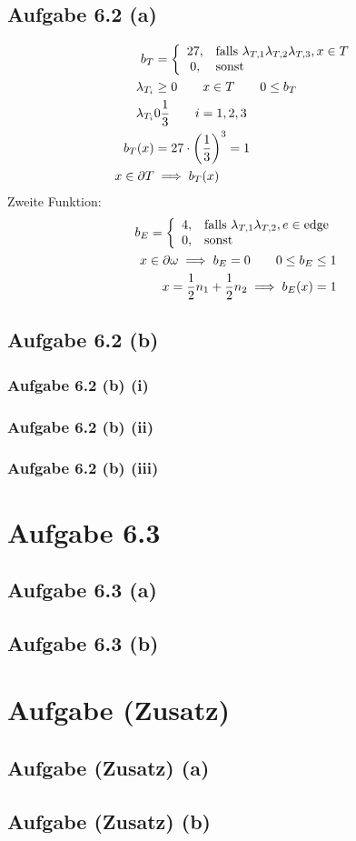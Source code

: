 \documentclass[12pt,a4paper]{article}
\begin{document}
\subsection*{Aufgabe 6.2 (a)}
\begin{align*}
	b_T&=\left\lbrace\begin{array}{cl}
		27, &\text{falls } \lambda_{T,1}\lambda_{T,2}\lambda_{T,3},x\in T\\
		0, &\text{sonst }
	\end{array}\right.\\
	\lambda_{T_i}&\geq 0\qquad x\in T\qquad 0\leq b_T\\
	\lambda_{T_i}&0\frac{1}{3}\qquad i=1,2,3\\
	b_T(x)&=27\cdot\left(\frac{1}{3}\right)^3=1\\
	x\in\partial T&\implies b_T(x)
\end{align*}
Zweite Funktion:
\begin{align*}
	b_E=\left\lbrace\begin{array}{cl}
		4, &\text{falls }\lambda_{T,1}\lambda_{T,2},e\in\text{edge}\\
		0, &\text{sonst }
	\end{array}\right.\\
	x\in\partial\omega\implies b_E=0\qquad 0\leq b_E\leq 1\\
	x=\frac{1}{2}n_1+\frac{1}{2}n_2\implies b_E(x)=1
\end{align*}

\subsection*{Aufgabe 6.2 (b)}
\subsubsection*{Aufgabe 6.2 (b) (i)}


\subsubsection*{Aufgabe 6.2 (b) (ii)}


\subsubsection*{Aufgabe 6.2 (b) (iii)}

\section*{Aufgabe 6.3}
\subsection*{Aufgabe 6.3 (a)}

\subsection*{Aufgabe 6.3 (b)}

\section*{Aufgabe (Zusatz)}
\subsection*{Aufgabe (Zusatz) (a)}

\subsection*{Aufgabe (Zusatz) (b)}
\end{document}
